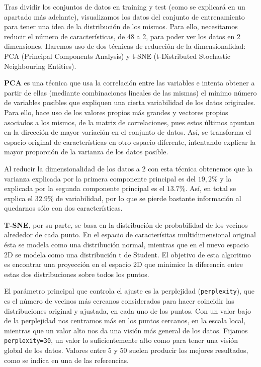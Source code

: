 \documentclass[a4]{article}
\begin{document}
Tras dividir los conjuntos de datos en training y test (como se explicará en un apartado más adelante), visualizamos los datos del conjunto de entrenamiento para tener una idea de la distribución de los mismos. 
Para ello, necesitamos reducir el número de características, de 48 a 2, para poder ver los datos en 2 dimensiones. Haremos uso de dos técnicas de reducción de la dimensionalidad: PCA (Principal Components Analysis) y t-SNE (t-Distributed Stochastic Neighbouring Entities). 

\textbf{PCA} es una técnica que usa la correlación entre las variables e intenta obtener a partir de ellas (mediante combinaciones lineales de las mismas) el mínimo número de variables posibles que expliquen una cierta variabilidad de los datos originales. Para ello, hace uso de los valores propios más grandes y vectores propios asociados a los mismos, de la matriz de correlaciones, pues estos últimos apuntan en la dirección de mayor variación en el conjunto de datos. Así, se transforma el espacio original de características en otro espacio diferente, intentando explicar la mayor proporción de la varianza de los datos posible. 

Al reducir la dimensionalidad de los datos a 2 con esta técnica obtenemos que la varianza explicada por la primera componente principal es del $19,2\%$ y la explicada por la segunda componente principal es el $13.7\%$. Así, en total se explica el $32.9\%$ de variabilidad, por lo que se pierde bastante información al quedarnos sólo con dos características. 

\textbf{T-SNE}, por su parte, se basa en la distribución de probabilidad de los vecinos alrededor de cada punto. En el espacio de caracterísitas multidimensional original ésta se modela como una distribución normal, mientras que en el nuevo espacio 2D se modela como una distribución t de Student. El objetivo de esta algoritmo es encontrar una proyección en el espacio 2D que minimice la diferencia entre estas dos distribuciones sobre todos los puntos. 

El parámetro principal que controla el ajuste es la perplejidad (\lstinline|perplexity|), que es el número de vecinos más cercanos considerados para hacer coincidir las distribuciones original y ajustada, en cada uno de los puntos. Con un valor bajo de la perplejidad nos centramos más en los puntos cercanos, en la escala local, mientras que un valor alto nos da una visión más general de los datos. Fijamos\\ \lstinline|perplexity=30|, un valor lo suficientemente alto como para tener una visión global de los datos. Valores entre 5 y 50 suelen producir los mejores resultados, como se indica en una de las referencias. 
\end{document}
